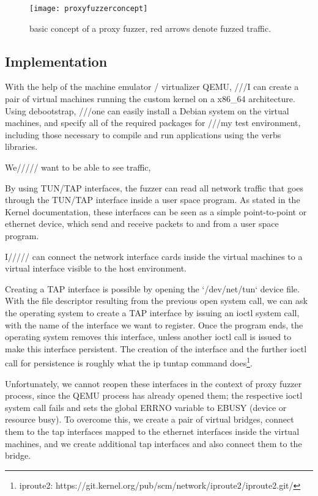 \begin{figure}[h]
  \centering
  \texttt{[image: proxyfuzzerconcept]}
  \caption{basic concept of a proxy fuzzer, red arrows denote fuzzed traffic.}
  \label{fig:fuzzerconcept}
\end{figure}

\subsection{Implementation} %

With the help of the machine emulator / virtualizer QEMU, ///I can create a pair of
virtual machines running the custom kernel on a x86\_64 architecture.
Using debootstrap, ///one can easily install a Debian system on
the virtual machines, and specify all of the required packages
for ///my test environment, including those necessary to compile and run applications
using the verbs libraries.

We///// want to be able to see traffic, %

By using TUN/TAP interfaces, the fuzzer can read all network traffic that goes
through the TUN/TAP interface inside a user space program. As stated in
the Kernel documentation, these interfaces can be seen as a simple point-to-point
or ethernet device, which send and receive packets to and from a user space program.

I///// can connect the network interface cards
inside the virtual machines to a virtual interface visible to the host environment.


Creating a TAP interface is possible by opening the `/dev/net/tun` device file.
With the file descriptor resulting from the previous open system call, we can ask the operating system
to create a TAP interface by issuing an ioctl system call, with the name of the interface we want to
register. Once the program ends, the operating system removes this interface, unless another ioctl call
is issued to make this interface persistent. The creation of the interface and the further ioctl call for persistence
is roughly what the ip tuntap command does\footnote{iproute2: https://git.kernel.org/pub/scm/network/iproute2/iproute2.git/ }.



Unfortunately, we cannot reopen these interfaces in the context of proxy fuzzer process, since the QEMU
process has already opened them; the respective ioctl system call fails and sets the
global ERRNO variable to EBUSY (device or resource busy). To overcome this, we create a pair of
virtual bridges, connect them to the tap interfaces mapped to the ethernet interfaces inside the virtual
machines, and we create additional tap interfaces and also connect them to the bridge.


